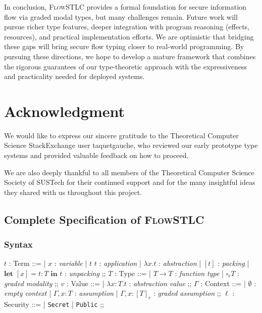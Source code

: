 \documentclass[conference]{IEEEtran}
\newcommand\lam[2]{\lambda #1.#2}
\newcommand\unp[3]{\textbf{let }[#1]=#2\textbf{ in }#3}
\newcommand\gradedt[2]{\square_#1 #2}
\begin{document}
In conclusion, \textsc{FlowSTLC} provides a formal foundation for secure information flow via graded modal types, but many challenges remain. Future work will pursue richer type features, deeper integration with program reasoning (effects, resources), and practical implementation efforts. We are optimistic that bridging these gaps will bring secure flow typing closer to real-world programming. By pursuing these directions, we hope to develop a mature framework that combines the rigorous guarantees of our type-theoretic approach with the expressiveness and practicality needed for deployed systems.

\section*{Acknowledgment}
We would like to express our sincere gratitude to the Theoretical Computer Science StackExchange user taquetgauche, who reviewed our early prototype type systems and provided valuable feedback on how to proceed.

We are also deeply thankful to all members of the Theoretical Computer Science Society of SUSTech for their continued support and for the many insightful ideas they shared with us throughout this project.




\newpage
\appendix

\subsection{Complete Specification of \textsc{FlowSTLC}}
\subsubsection{Syntax}
\begin{center}
	\begin{bnf}
		$t$ : \textsf{Term} ::=
		| $x$ : \textit{variable}
		| $t$ $t$ : \textit{application}
		| $\lam{x}{t}$ : \textit{abstraction}
		| $[t]$ : \textit{packing}
		| $\unp{x}{t\colon T}{t}$ : \textit{unpacking}
		;;
		$T$ : \textsf{Type} ::=
		| $T\to T$ : \textit{function type}
		| $\gradedt{r}{T}$ : \textit{graded modality}
		;;
		$v$ : \textsf{Value} ::=
		| $\lam{x\colon T}{t}$ : \textit{abstraction value}
		;;
		$\Gamma$ : \textsf{Context} ::=
		| $\emptyset$ : \textit{empty context}
        | $\Gamma,x\colon T$ : \textit{assumption}
		| $\Gamma,x\colon[T]_r$ : \textit{graded assumption}
		;;
		$\ell$ : \textsf{Security} ::=
		| \texttt{Secret}
		| \texttt{Public}
		;;
	\end{bnf}
\end{center}
\end{document}
